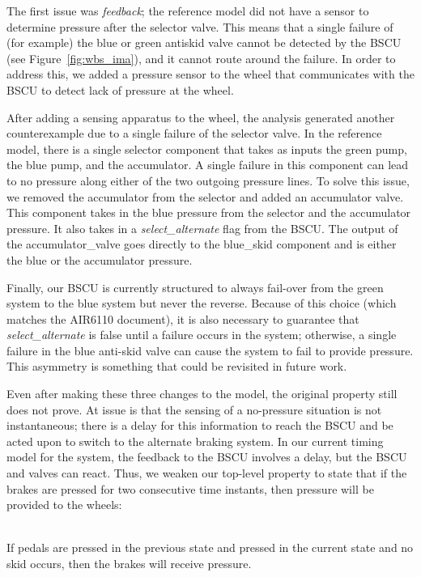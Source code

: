 The first issue was {\em feedback}; the reference model did not have a sensor to determine pressure after the selector valve.  This means that a single failure of (for example) the blue or green antiskid valve cannot be detected by the BSCU (see Figure~\ref{fig:wbs_ima}), and it cannot route around the failure.  In order to address this, we added a pressure sensor to the wheel that communicates with the BSCU to detect lack of pressure at the wheel.


After adding a sensing apparatus to the wheel, the analysis generated another counterexample due to a single failure of the selector valve.  In the reference model, there is a single selector component that takes as inputs the green pump, the blue pump, and the accumulator.  A single failure in this component can lead to no pressure along either of the two outgoing pressure lines.
To solve this issue, we removed the accumulator from the selector and added an accumulator valve.   This component takes in the blue pressure from the selector and the accumulator pressure. It also takes in a \textit{select\_alternate} flag from the BSCU. The output of the accumulator\_valve goes directly to the blue\_skid component and is either the blue or the accumulator pressure.

Finally, our BSCU is currently structured to always fail-over from the green system to the blue system but never the reverse.  Because of this choice (which matches the AIR6110 document), it is also necessary to guarantee that \textit{select\_alternate} is false until a failure occurs in the system; otherwise, a single failure in the blue anti-skid valve can cause the system to fail to provide pressure.  This asymmetry is something that could be revisited in future work.


Even after making these three changes to the model, the original property still does not prove.  At issue is that the sensing of a no-pressure situation is not instantaneous; there is a delay for this information to reach the BSCU and be acted upon to switch to the alternate braking system.  In our current timing model for the system, the feedback to the BSCU involves a delay, but the BSCU and valves can react.  Thus, we weaken our top-level property to state that if the brakes are pressed for two consecutive time instants, then pressure will be provided to the wheels:

\begin{tt}
\ \\
If pedals are pressed in the previous state and pressed in the current state and no skid occurs, then the brakes will receive pressure. \\
\end{tt}


















